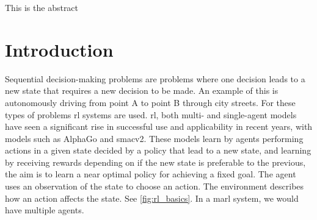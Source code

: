 \documentclass[UKenglish]{uiomasterthesis}
\begin{document}
\abstract
This is the abstract

\tableofcontents
\listoftables
\listoffigures
\chapter{Introduction}

Sequential decision-making problems are problems where one decision leads to a new state that requires a new decision to be made. An example of this is autonomously driving from point A to point B through city streets. For these types of problems \ac{rl} systems are used. \ac{rl}, both multi- and single-agent models have seen a significant rise in successful use and applicability in recent years, with models such as AlphaGo\cite{article} and smacv2\cite{ellis2023smacv2}. These models learn by agents performing actions in a given state decided by a policy that lead to a new state, and learning by receiving rewards depending on if the new state is preferable to the previous, the aim is to learn a near optimal policy for achieving a fixed goal\cite{Sutton1998}. The agent uses an observation of the state to choose an action. The environment describes how an action affects the state. See \cref{fig:rl_basics}. In a \ac{marl} system, we would have multiple agents.
\end{document}
